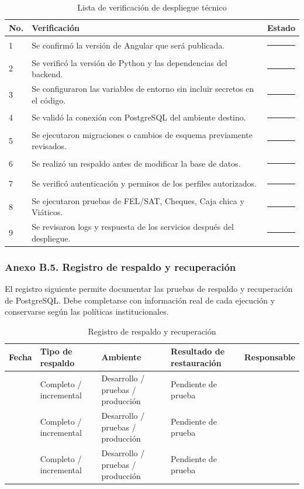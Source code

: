 \begin{longtable}{p{0.9cm}p{8.5cm}p{3.0cm}}
\caption{Lista de verificación de despliegue técnico}\label{tab:B_checklist_despliegue}\\
\toprule
\textbf{No.} & \textbf{Verificación} & \textbf{Estado}\\
\midrule
1 & Se confirmó la versión de Angular que será publicada. & \rule{2.5cm}{0.4pt}\\
2 & Se verificó la versión de Python y las dependencias del backend. & \rule{2.5cm}{0.4pt}\\
3 & Se configuraron las variables de entorno sin incluir secretos en el código. & \rule{2.5cm}{0.4pt}\\
4 & Se validó la conexión con PostgreSQL del ambiente destino. & \rule{2.5cm}{0.4pt}\\
5 & Se ejecutaron migraciones o cambios de esquema previamente revisados. & \rule{2.5cm}{0.4pt}\\
6 & Se realizó un respaldo antes de modificar la base de datos. & \rule{2.5cm}{0.4pt}\\
7 & Se verificó autenticación y permisos de los perfiles autorizados. & \rule{2.5cm}{0.4pt}\\
8 & Se ejecutaron pruebas de FEL/SAT, Cheques, Caja chica y Viáticos. & \rule{2.5cm}{0.4pt}\\
9 & Se revisaron logs y respuesta de los servicios después del despliegue. & \rule{2.5cm}{0.4pt}\\
\bottomrule
\end{longtable}

\subsubsection{Anexo B.5. Registro de respaldo y recuperación}
El registro siguiente permite documentar las pruebas de respaldo y recuperación de PostgreSQL. Debe completarse con información real de cada ejecución y conservarse según las políticas institucionales.

\begin{longtable}{p{2.3cm}p{3.0cm}p{3.0cm}p{3.0cm}p{2.0cm}}
\caption{Registro de respaldo y recuperación}\label{tab:B_registro_respaldo}\\
\toprule
\textbf{Fecha} & \textbf{Tipo de respaldo} & \textbf{Ambiente} & \textbf{Resultado de restauración} & \textbf{Responsable}\\
\midrule
 & Completo / incremental & Desarrollo / pruebas / producción & Pendiente de prueba & \\
 & Completo / incremental & Desarrollo / pruebas / producción & Pendiente de prueba & \\
 & Completo / incremental & Desarrollo / pruebas / producción & Pendiente de prueba & \\
\bottomrule
\end{longtable}

